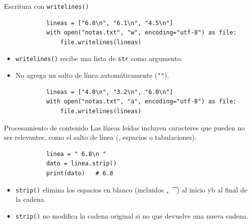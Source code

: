 \documentclass{beamer}
\begin{document}
    \begin{frame}[fragile, t]{Escritura con \texttt{writelines()}}
        \begin{verbatim}
            lineas = ["6.8\n", "6.1\n", "4.5\n"]
            with open("notas.txt", "w", encoding="utf-8") as file:
                file.writelines(lineas)
        \end{verbatim}

        \begin{itemize}
            \item \texttt{writelines()} recibe una lista de \texttt{str} como argumento.
            \item No agrega un salto de línea automáticamente (\texttt{"\n"}).
        \end{itemize}

        \begin{verbatim}
            lineas = ["4.0\n", "3.2\n", "6.0\n"]
            with open("notas.txt", "a", encoding="utf-8") as file:
                file.writelines(lineas)
        \end{verbatim}
    \end{frame}

    \begin{frame}[fragile, t]{Procesamiento de contenido}
        Las líneas leídas incluyen caracteres que pueden no ser relevantes, como el salto de línea (\texttt{\n}, espacios o tabulaciones).

        \begin{verbatim}
            linea = " 6.8\n "
            dato = linea.strip()
            print(dato)   # 6.8
        \end{verbatim}

        \begin{itemize}
            \item \texttt{strip()} elimina los espacios en blanco (incluidos \texttt{\n, \t}) al inicio yb al final de la cadena.
            \item \texttt{strip()} no modifica la cadena original si no que devuelve una nueva cadena.
        \end{itemize}
    \end{frame}
\end{document}
